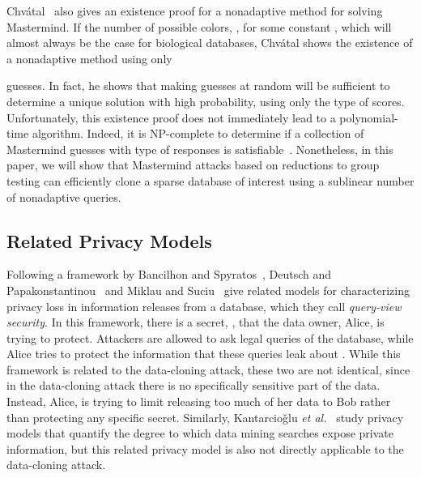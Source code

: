 \documentclass{article}
\begin{document}
Chv{\'a}tal~\cite{c-m-83} also gives an existence proof for a 
nonadaptive method for solving Mastermind.
If the number of possible colors, , 
for some constant , which will almost
always be the case for biological databases, Chv{\'a}tal shows the existence
of a nonadaptive method using only 

guesses.
In fact, he shows that making  guesses at random will be sufficient to
determine a unique solution with high probability, using only the
 type of scores.
Unfortunately, this existence proof does not immediately lead to a
polynomial-time algorithm.
Indeed, it is NP-complete to determine if a collection of Mastermind guesses
with  type of responses is satisfiable~\cite{g-oacmg-09}.  Nonetheless,
in this paper, we will show that Mastermind attacks based on reductions to
group testing can efficiently clone a sparse database of interest
using a sublinear number of nonadaptive queries.

\subsection{Related Privacy Models}

Following a framework by 
Bancilhon and Spyratos~\cite{bs-pirdd-77},
Deutsch and Papakonstantinou~\cite{dp-pidp-05}
and Miklau and Suciu~\cite{ms-faidd-07}
give related models for
characterizing privacy loss in information releases from a database, 
which they call \emph{query-view security}.
In this framework, there is a
secret, , that the data owner, Alice, is trying to protect.
Attackers are allowed to ask legal queries of the database,
while Alice tries to protect the information that these
queries leak about .
While this framework is related to the data-cloning attack,
these two are not identical, since in the data-cloning attack
there is no specifically sensitive part of the
data. Instead, Alice, is trying to limit releasing too much of her data
to Bob rather than protecting any specific secret.
Similarly, 
Kantarcio\v{g}lu {\it et al.}~\cite{kjc-wdmvp-04} study privacy models that quantify
the degree to which data mining searches expose private information, but this
related privacy model is also not directly applicable to the data-cloning attack.
\end{document}
